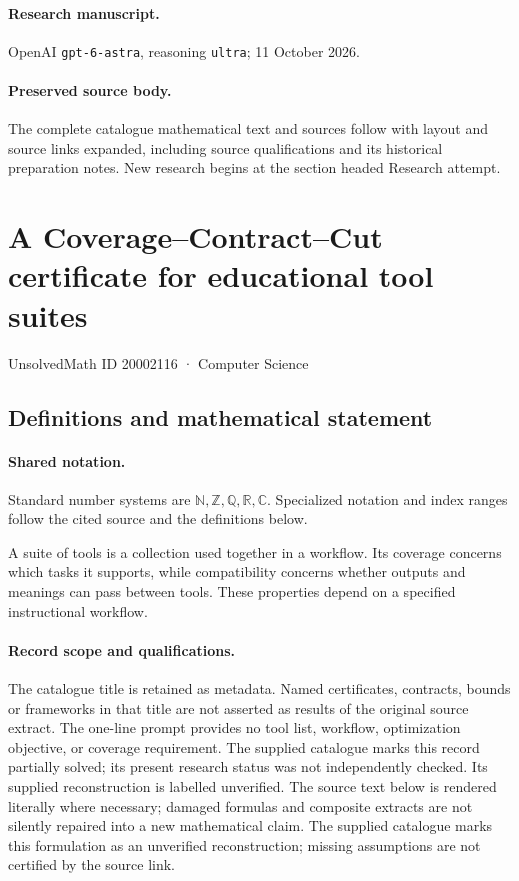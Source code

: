 \documentclass[11pt]{article}
\begin{document}
\paragraph{Research manuscript.} OpenAI \texttt{gpt-6-astra}, reasoning \texttt{ultra}; 11 October 2026.
\paragraph{Preserved source body.} The complete catalogue mathematical text and sources follow with layout and source links expanded, including source qualifications and its historical preparation notes. New research begins at the section headed Research attempt.

\section{A Coverage--Contract--Cut certificate for educational tool suites}\label{20002116}
{\small UnsolvedMath ID 20002116 · Computer Science}
\subsection{Definitions and mathematical statement}

\paragraph{Shared notation.}Standard number systems are $\mathbb N,\mathbb Z,\mathbb Q,\mathbb R,\mathbb C$. Specialized notation and index ranges follow the cited source and the definitions below.


A suite of tools is a collection used together in a workflow. Its coverage concerns which tasks it supports, while compatibility concerns whether outputs and meanings can pass between tools. These properties depend on a specified instructional workflow.
\paragraph{Record scope and qualifications.}
The catalogue title is retained as metadata. Named certificates, contracts, bounds or frameworks in that title are not asserted as results of the original source extract.
The one-line prompt provides no tool list, workflow, optimization objective, or coverage requirement. The supplied catalogue marks this record partially solved; its present research status was not independently checked. Its supplied reconstruction is labelled unverified.
The source text below is rendered literally where necessary; damaged formulas and composite extracts are not silently repaired into a new mathematical claim.
The supplied catalogue marks this formulation as an unverified reconstruction; missing assumptions are not certified by the source link.
\end{document}
